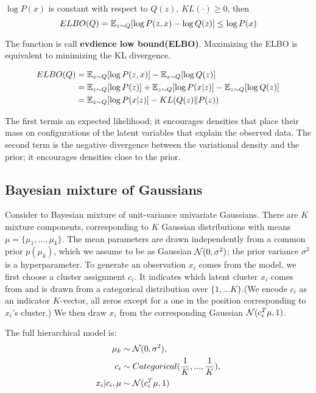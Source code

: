 $\log P(x)$ is constant with respect to $Q(z)$, $KL(\cdot ) \ge 0$, then
\begin{equation}
    ELBO(Q) = \mathbb{E}_{z \sim Q} [\log P(z, x) - \log Q(z)] \le \log P(x)
\end{equation}

The function is call \textbf{evdience low bound(ELBO)}. Maximizing the ELBO is equivalent to
minimizing the KL divergence.

\begin{equation}
    \begin{split}
        ELBO(Q)
        &= \mathbb{E}_{z \sim Q} [\log P(z, x)] - \mathbb{E}_{z \sim Q} [\log Q(z)] \\
        &= \mathbb{E}_{z \sim Q} [\log P(z)] + \mathbb{E}_{z \sim Q} [\log P(x|z)] - \mathbb{E}_{z \sim Q} [\log Q(z)] \\
        &= \mathbb{E}_{z \sim Q} [\log P(x|z)] - KL(Q(z)\|P(z))
    \end{split}
\end{equation}

The first termis an expected likelihood; it encourages densities
that place their mass on configurations of the latent variables
that explain the observed data. The second term is the negative
divergence between the variational density and the prior; it encourages
densities close to the prior.

\subsection{Bayesian mixture of Gaussians}
Consider to Bayesian mixture of unit-variance univariate Gaussians. There are $K$ mixture components, corresponding to $K$ Gaussian
distributions with means $\mu = \{\mu_1,...,\mu_k\}$. The mean parameters are drawn independently from a common prior $p(\mu_k)$, which
we assume to be as Gaussian $\mathcal{N}(0, \sigma^2)$; the prior variance $\sigma^2$ is a hyperparameter. To generate an observation $x_i$ comes
from the model, we first choose a cluster assignment $c_i$. It indicates which latent cluster $x_i$ comes from and is drawn from a categorical
distribution over $\{1,...K\}$.(We encode $c_i$ as an indicator $K$-vector, all zeros except for a one in the position corresponding to $x_i$'s cluster.)
We then draw $x_i$ from the corresponding Gaussian $\mathcal{N}(c_i^T\mu, 1)$.

The full hierarchical model is:
\begin{equation}
    \begin{split}
        \mu_k &\sim \mathcal{N}(0, \sigma^2), \\
        c_i &\sim Categorical(\frac{1}{K}, ..., \frac{1}{K}), \\
        x_i|c_i, \mu &\sim \mathcal{N}(c_i^T\mu, 1)
    \end{split}
\end{equation}
